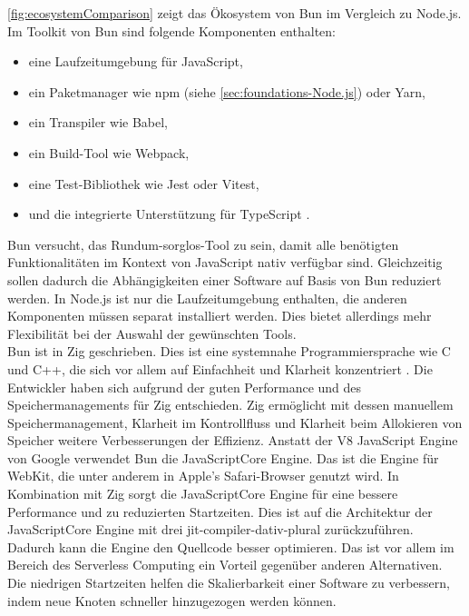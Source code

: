 \noindent
\autoref{fig:ecosystemComparison} zeigt das Ökosystem von Bun im Vergleich zu Node.js. Im Toolkit von Bun sind folgende Komponenten enthalten:
\begin{itemize}
	\item eine Laufzeitumgebung für JavaScript,
	\item ein Paketmanager wie \ac{npm} (siehe \autoref{sec:foundations-Node.js}) oder Yarn, 
	\item ein Transpiler wie Babel,
	\item ein Build-Tool wie Webpack,
	\item eine Test-Bibliothek wie Jest oder Vitest,
	\item und die integrierte Unterstützung für TypeScript \cite{Sumner.2023c}.
\end{itemize}

\noindent
Bun versucht, das Rundum-sorglos-Tool zu sein, damit alle benötigten Funktionalitäten im Kontext von JavaScript nativ verfügbar sind. Gleichzeitig sollen dadurch die Abhängigkeiten einer Software auf Basis von Bun reduziert werden. In Node.js ist nur die Laufzeitumgebung enthalten, die anderen Komponenten müssen separat installiert werden. Dies bietet allerdings mehr Flexibilität bei der Auswahl der gewünschten Tools.\cite{Springer.2022, OvenSh.2023c}\\

\noindent
Bun ist in Zig geschrieben. Dies ist eine systemnahe Programmiersprache wie C und C++, die sich vor allem auf Einfachheit und Klarheit konzentriert \cite{ZigSoftwareFoundation.o.J.}. Die Entwickler haben sich aufgrund der guten Performance und des Speichermanagements für Zig entschieden. Zig ermöglicht mit dessen manuellem Speichermanagement, Klarheit im Kontrollfluss und Klarheit beim Allokieren von Speicher weitere Verbesserungen der Effizienz. Anstatt der V8 JavaScript Engine von Google verwendet Bun die JavaScriptCore Engine. Das ist die Engine für WebKit, die unter anderem in Apple's Safari-Browser genutzt wird. In Kombination mit Zig sorgt die JavaScriptCore Engine für eine bessere Performance und zu reduzierten Startzeiten. Dies ist auf die Architektur der JavaScriptCore Engine mit drei \ac{jit-compiler-dativ-plural}  zurückzuführen. Dadurch kann die Engine den Quellcode besser optimieren. Das ist vor allem im Bereich des Serverless Computing ein Vorteil gegenüber anderen Alternativen. Die niedrigen Startzeiten helfen die Skalierbarkeit einer Software zu verbessern, indem neue Knoten schneller hinzugezogen werden können.\cite{OvenSh.2023c, OvenSh.2022, Apple.o.J., Apple.o.J.b, Silva.2020}

